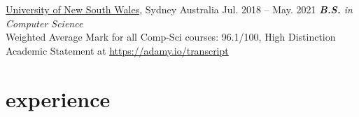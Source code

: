 \documentclass[hidelinks__VERSION__]{adamyi-cv}
\begin{document}
\begin{entrylist}


\entry
{\href{https://unsw.edu.au}{University of New South Wales}, Sydney Australia}
{Jul. 2018 -- May. 2021}
{\emph{\textbf{B.S.} in Computer Science}\\
Weighted Average Mark for all Comp-Sci courses: 96.1/100, High Distinction\\
Academic Statement at \href{https://adamy.io/transcript}{https://adamy.io/transcript}
}

\end{entrylist}


\section{experience}
\end{document}
